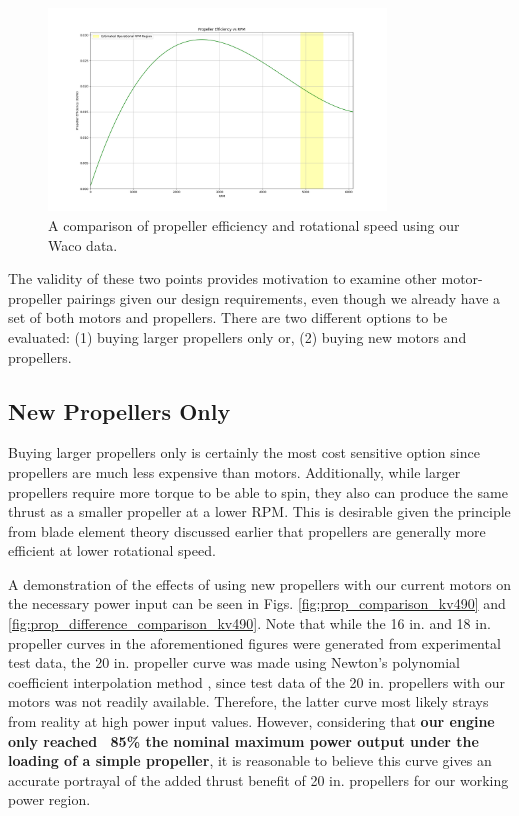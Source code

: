 \documentclass{article}
\begin{document}
\begin{figure}[htbp]
    \centering
    \includegraphics[width=0.8\textwidth]{Prop Efficiency vs RPM (experimental).png}
    \caption{A comparison of propeller efficiency and rotational speed using our Waco data.}
    \label{fig:prop_efficiency}
\end{figure}

The validity of these two points provides motivation to examine other motor-propeller pairings given our design requirements, even though we already have a set of both motors and propellers. There are two different options to be evaluated: (1) buying larger propellers only or, (2) buying new motors and propellers. 

\subsection{New Propellers Only}
Buying larger propellers only is certainly the most cost sensitive option since propellers are much less expensive than motors. Additionally, while larger propellers require more torque to be able to spin, they also can produce the same thrust as a smaller propeller at a lower RPM. This is desirable given the principle from blade element theory discussed earlier that propellers are generally more efficient at lower rotational speed. 

A demonstration of the effects of using new propellers with our current motors on the necessary power input can be seen in Figs. \ref{fig:prop_comparison_kv490} and \ref{fig:prop_difference_comparison_kv490}. Note that while the 16 in. and 18 in. propeller curves in the aforementioned figures were generated from experimental test data, the 20 in. propeller curve was made using Newton's polynomial coefficient interpolation method \cite{python}, since test data of the 20 in. propellers with our motors was not readily available. Therefore, the latter curve most likely strays from reality at high power input values. However, considering that \textbf{our engine only reached ~85\% the nominal maximum power output under the loading of a simple propeller}, it is reasonable to believe this curve gives an accurate portrayal of the added thrust benefit of 20 in. propellers for our working power region.
\end{document}
